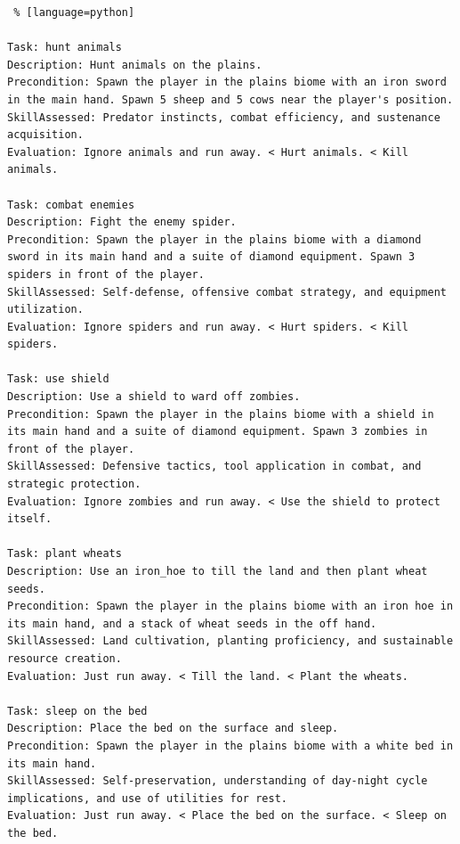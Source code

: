 \begin{lstlisting} % [language=python]  

Task: hunt animals
Description: Hunt animals on the plains. 
Precondition: Spawn the player in the plains biome with an iron sword in the main hand. Spawn 5 sheep and 5 cows near the player's position. 
SkillAssessed: Predator instincts, combat efficiency, and sustenance acquisition.
Evaluation: Ignore animals and run away. < Hurt animals. < Kill animals. 

Task: combat enemies
Description: Fight the enemy spider. 
Precondition: Spawn the player in the plains biome with a diamond sword in its main hand and a suite of diamond equipment. Spawn 3 spiders in front of the player. 
SkillAssessed: Self-defense, offensive combat strategy, and equipment utilization.
Evaluation: Ignore spiders and run away. < Hurt spiders. < Kill spiders. 

Task: use shield
Description: Use a shield to ward off zombies. 
Precondition: Spawn the player in the plains biome with a shield in its main hand and a suite of diamond equipment. Spawn 3 zombies in front of the player. 
SkillAssessed: Defensive tactics, tool application in combat, and strategic protection. 
Evaluation: Ignore zombies and run away. < Use the shield to protect itself. 

Task: plant wheats
Description: Use an iron_hoe to till the land and then plant wheat seeds. 
Precondition: Spawn the player in the plains biome with an iron hoe in its main hand, and a stack of wheat seeds in the off hand. 
SkillAssessed: Land cultivation, planting proficiency, and sustainable resource creation.
Evaluation: Just run away. < Till the land. < Plant the wheats. 

Task: sleep on the bed
Description: Place the bed on the surface and sleep. 
Precondition: Spawn the player in the plains biome with a white bed in its main hand. 
SkillAssessed: Self-preservation, understanding of day-night cycle implications, and use of utilities for rest. 
Evaluation: Just run away. < Place the bed on the surface. < Sleep on the bed. 

\end{lstlisting}


